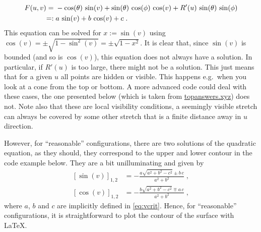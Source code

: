 \documentclass[a4paper,fleqn]{ltxdoc}
\begin{document}
\begin{align}
 F(u,v)={}&{}-\cos (\theta)\,\sin (v)+
 \sin (\theta )\,\cos(\phi)\,\cos (v)+ R'(u)\,\sin(\theta)\,\sin (\phi)\notag\\
 =:{}&{}a\,\sin (v)+b\,\cos(v)+c\;.\label{eq:vcrit}
\end{align} 
This equation can be solved for $x:=\sin (v)$ using 
$\cos(v)=\pm\sqrt{1-\sin^2(v)}=\pm\sqrt{1-x^2}$. It is clear that, since  $\sin
(v)$ is bounded (and so is $\cos(v)$), this equation does not always have a
solution. In particular, if $R'(u)$ is too large, there might not be a solution.
This just means that for a given $u$ all points are hidden or visible. This
happens e.g.\ when you look at a cone from the top or bottom. A more advanced
code could deal with these cases, the one presented below (which is taken from
\href{https://topanswers.xyz/tex?q=1218\#a1447}{topanswers.xyz}) does not. Note also
that these are local visibility conditions, a seemingly visible stretch can
always be covered by some other stretch that is a finite distance away in $u$
direction.

However, for ``reasonable'' configurations, there are two solutions of the
quadratic equation, as they should, they correspond to the upper and lower
contour in the code example below. They are a bit unilluminating and given by
\begin{subequations}\label{eq:cvandsv}
\begin{align}
 [\sin(v)]_{1,2}&=-\frac{a \sqrt{a^2+b^2-c^2}\pm b\,c}{a^2+b^2}\;,\\
 [\cos(v)]_{1,2}&=-\frac{b \sqrt{a^2+b^2-c^2}\mp a\,c}{a^2+b^2}\;,
\end{align}
\end{subequations}
where $a$, $b$ and $c$ are implicitly defined in \eqref{eq:vcrit}. Hence, for
``reasonable'' configurations, it is straightforward to plot the contour of the
surface with \LaTeX.
\end{document}
